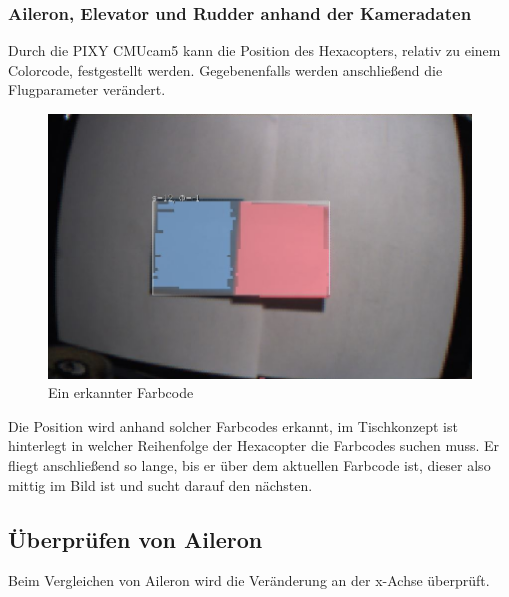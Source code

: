     \subsubsection{Aileron, Elevator und Rudder anhand der Kameradaten}
    Durch die PIXY CMUcam5 kann die Position des Hexacopters, relativ zu einem Colorcode, festgestellt werden. Gegebenenfalls werden anschließend die Flugparameter verändert.

    \begin{figure} [tbh]
      \begin{centering}
        \includegraphics[width = \textwidth]{Bilder/Farbcode_erkannt}
      \par\end{centering}
      \caption{Ein erkannter Farbcode}
      \label{Farbcode_erkannt}
    \end{figure}
    Die Position wird anhand solcher Farbcodes erkannt, im Tischkonzept ist hinterlegt in welcher Reihenfolge der Hexacopter die Farbcodes suchen muss.
    Er fliegt anschließend so lange, bis er über dem aktuellen Farbcode ist, dieser also mittig im Bild ist und sucht darauf den nächsten.

    \subsection*{Überprüfen von Aileron}
    Beim Vergleichen von Aileron wird die Veränderung an der x-Achse überprüft.

